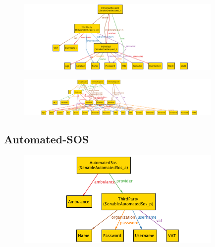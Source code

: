 \documentclass[a4paper]{article}
\begin{document}
    
    
    \begin{figure}[!htpb]
    	\centering
    	\includegraphics[width=100mm]{images/alloy/makeOneRequest.png}
    \end{figure}
    
    
    
    \begin{figure}[!htpb]
    	\centering
    	\includegraphics[width=100mm]{images/alloy/Data4HelpComplete.png}
    \end{figure}

\subsection{Automated-SOS}
    
    
    
    
    \begin{figure}[!htpb]
    	\centering
    	\includegraphics[width=100mm]{images/alloy/enableAutomatedSos.png}
    \end{figure}
    
\end{document}

